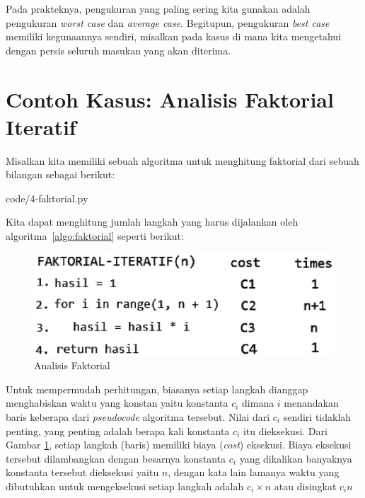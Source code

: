 Pada prakteknya, pengukuran yang paling sering kita gunakan adalah pengukuran \textit{worst case} dan \textit{average case}. Begitupun, pengukuran \textit{best case} memiliki kegunaannya sendiri, misalkan pada kasus di mana kita mengetahui dengan persis seluruh masukan yang akan diterima.

\section{Contoh Kasus: Analisis Faktorial Iteratif}

Misalkan kita memiliki sebuah algoritma untuk menghitung faktorial dari sebuah bilangan sebagai berikut:


                {code/4-faktorial.py}

Kita dapat menghitung jumlah langkah yang harus dijalankan oleh algoritma~\ref{algo:faktorial} seperti berikut:

\begin{figure}%
    \includegraphics[scale=0.5]{fig/faktorialAnalysis}%
    \caption{Analisis Faktorial}%
    \label{fig:analisis-faktorial}%
\end{figure}

\FloatBarrier

Untuk mempermudah perhitungan, biasanya setiap langkah dianggap menghabiskan waktu yang konstan yaitu konstanta $c_i$ dimana $i$ menandakan baris keberapa dari \textit{pseudocode} algoritma tersebut. Nilai dari $c_i$ sendiri tidaklah penting, yang penting adalah berapa kali konstanta $c_i$ itu dieksekusi. Dari Gambar \ref{fig:analisis-faktorial}, setiap langkah (baris) memiliki biaya (\textit{cost}) eksekusi. 
Biaya eksekusi tersebut dilambangkan dengan besarnya konstanta $c_i$ yang dikalikan banyaknya konstanta tersebut dieksekusi yaitu $n$, dengan kata lain lamanya waktu yang dibutuhkan untuk mengeksekusi setiap langkah adalah $c_{i}\times{}n$ atau disingkat $c_{i}n$

